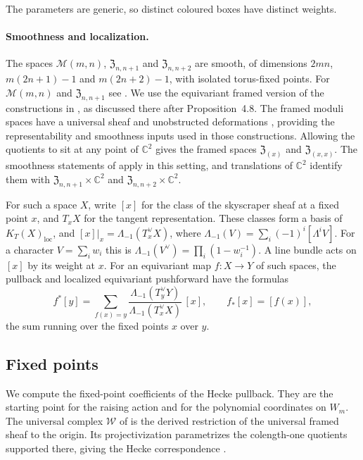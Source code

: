 \documentclass[11pt]{amsart}
\theoremstyle{definition}
\theoremstyle{remark}
\newcommand{\Kloc}[1]{K_T(#1)_{\mathrm{loc}}}    %
\newcommand{\Gies}[2]{\mathcal M(#1,#2)}         %
\newcommand{\Zc}{\mathfrak Z}
\newcommand{\Hecke}[1]{\Zc_{#1,#1+1}}            %
\newcommand{\HeckeTwo}[1]{\Zc_{#1,#1+2}}         %
\newcommand{\Wsp}[1]{W_{#1}}                     %
\newcommand{\Wc}{\mathcal W}                     %
\newcommand{\ZNtwo}[1]{\mathfrak Z_{(#1)}}       %
\begin{document}
The parameters are generic, so distinct coloured boxes have distinct weights.

\paragraph{Smoothness and localization.}
The spaces \(\Gies{m}{n}\), \(\Hecke{n}\) and \(\HeckeTwo{n}\) are smooth, of
dimensions \(2mn\), \(m(2n+1)-1\) and \(m(2n+2)-1\), with isolated torus-fixed
points. For \(\Gies{m}{n}\) and \(\Hecke{n}\) see \cite[Sections~2
and~3.1]{N1}. We use the equivariant framed version of the constructions in
\cite{N2}, as discussed there after Proposition~4.8. The framed moduli spaces
have a universal sheaf and unobstructed deformations \cite[Section~2]{N1},
providing the representability and smoothness inputs used in those constructions.
Allowing the quotients to sit at any point of \(\mathbb C^2\) gives the framed
spaces \(\ZNtwo{x}\) and \(\ZNtwo{x,x}\). The smoothness statements of
\cite[Propositions~2.26 and~2.27]{N2} apply in this setting, and translations of \(\mathbb C^2\)
identify them with \(\Hecke{n}\times\mathbb C^2\) and
\(\HeckeTwo{n}\times\mathbb C^2\).

For such a space \(X\), write \([x]\) for the class of the skyscraper sheaf at
a fixed point \(x\), and \(T_xX\) for the tangent representation. These classes
form a basis of \(\Kloc{X}\), and \([x]|_x=\Lambda_{-1}(T_x^\vee X)\), where
\(\Lambda_{-1}(V)=\sum_i(-1)^i[\Lambda^iV]\). For a character
\(V=\sum_iw_i\) this is \(\Lambda_{-1}(V^\vee)=\prod_i(1-w_i^{-1})\). A line
bundle acts on \([x]\) by its weight at \(x\). For an equivariant map \(f\colon X\to Y\)
of such spaces, the pullback and localized equivariant pushforward have the formulas
\begin{equation}\label{eq:localisation}
 f^*[y]=\sum_{f(x)=y}\frac{\Lambda_{-1}(T_y^\vee Y)}{\Lambda_{-1}(T_x^\vee X)}\,[x],
 \qquad f_*[x]=[f(x)],
\end{equation}
the sum running over the fixed points \(x\) over \(y\).

\subsection{Fixed points}\label{sec:fixedpoints}

We compute the fixed-point coefficients of the Hecke pullback. They are the starting
point for the raising action and for the polynomial coordinates on \(\Wsp{m}\).
The universal complex \(\Wc\) of \cite[(2.4)]{N1} is the derived restriction of the
universal framed sheaf to the origin. Its projectivization parametrizes the
colength-one quotients supported there, giving the Hecke correspondence
\cite[Proposition~2.19]{N2}.
\end{document}
